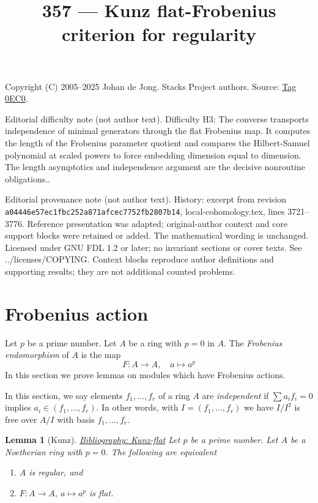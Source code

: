\documentclass{amsart}
\newenvironment{reference}{\comment}{\endcomment}
\theoremstyle{plain}
\newtheorem{lemma}[subsection]{Lemma}
\theoremstyle{definition}
\theoremstyle{remark}
\numberwithin{equation}{subsection}
\begin{document}
\title[Stacks Project, Tag 0EC0]{357 --- Kunz flat-Frobenius criterion for regularity}
\maketitle
\noindent Copyright (C) 2005--2025 Johan de Jong. Stacks Project authors. Source: \href{https://stacks.math.columbia.edu/tag/0EC0}{Tag 0EC0}.

\noindent Editorial difficulty note (not author text). Difficulty H3: The converse transports independence of minimal generators through the flat Frobenius map. It computes the length of the Frobenius parameter quotient and compares the Hilbert-Samuel polynomial at scaled powers to force embedding dimension equal to dimension. The length asymptotics and independence argument are the decisive nonroutine obligations..

\noindent Editorial provenance note (not author text). History: excerpt from revision \texttt{a0444\allowbreak 6e57e\allowbreak c1fbc\allowbreak 252a8\allowbreak 71afc\allowbreak ec775\allowbreak 2fb28\allowbreak 07b14}, local-cohomology.tex, lines 3721--3776. Reference presentation was adapted; original-author context and core support blocks were retained or added. The mathematical wording is unchanged. Licensed under GNU FDL 1.2 or later; no invariant sections or cover texts. See ../licenses/COPYING. Context blocks reproduce author definitions and supporting results; they are not additional counted problems.

\section{Frobenius action}
\label{section-frobenius}

\noindent
Let $p$ be a prime number. Let $A$ be a ring with $p = 0$ in $A$.
The {\it Frobenius endomorphism} of $A$ is the map
$$
F : A \longrightarrow A,
\quad
a \longmapsto a^p
$$
In this section we prove lemmas on modules which have
Frobenius actions.



\noindent
In this section, we say elements $f_1, \ldots, f_r$ of a ring $A$
are {\it independent} if $\sum a_if_i = 0$ implies
$a_i \in (f_1, \ldots, f_r)$. In other words, with $I = (f_1, \ldots, f_r)$
we have $I/I^2$ is free over $A/I$ with basis $f_1, \ldots, f_r$.


\begin{lemma}[Kunz]
\label{lemma-frobenius-flat-regular}
\begin{reference}
\href{https://stacks.math.columbia.edu/bibliography}{Bibliography: Kunz-flat}
\end{reference}
Let $p$ be a prime number.
Let $A$ be a Noetherian ring with $p = 0$.
The following are equivalent
\begin{enumerate}
\item $A$ is regular, and
\item $F : A \to A$, $a \mapsto a^p$ is flat.
\end{enumerate}
\end{lemma}
\end{document}
